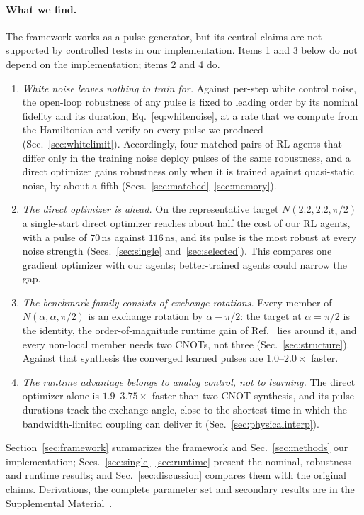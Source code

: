 \documentclass[aps,prx,twocolumn,superscriptaddress,nofootinbib,amsmath,amssymb,floatfix]{revtex4-2}
\newcommand{\Ntgt}[2]{N(#1,#1,#2)}
\newcommand{\ns}{\,\mathrm{ns}}
\begin{document}
\paragraph*{What we find.}
The framework works as a pulse generator, but its central claims are not supported by controlled tests
in our implementation. Items 1 and 3 below do not depend on the implementation; items 2 and 4 do.
\begin{enumerate}
\item \emph{White noise leaves nothing to train for.} Against per-step white control noise, the open-loop
robustness of any pulse is fixed to leading order by its nominal fidelity and its duration,
Eq.~\eqref{eq:whitenoise}, at a rate that we compute from the Hamiltonian and verify on every pulse we
produced (Sec.~\ref{sec:whitelimit}). Accordingly, four matched pairs of RL agents that differ only in
the training noise deploy pulses of the same robustness, and a direct optimizer gains robustness only when
it is trained against quasi-static noise, by about a fifth (Secs.~\ref{sec:matched}--\ref{sec:memory}).
\item \emph{The direct optimizer is ahead.} On the representative target $\Ntgt{2.2}{\pi/2}$ a single-start
direct optimizer reaches about half the cost of our RL agents, with a pulse of $70\ns$ against $116\ns$,
and its pulse is the most robust at every noise strength (Secs.~\ref{sec:single}
and~\ref{sec:selected}). This compares one gradient optimizer with our agents; better-trained agents
could narrow the gap.
\item \emph{The benchmark family consists of exchange rotations.} Every member of $\Ntgt{\alpha}{\pi/2}$
is an exchange rotation by $\alpha-\pi/2$: the target at $\alpha=\pi/2$ is the identity, the
order-of-magnitude runtime gain of Ref.~\cite{Niu2019} lies around it, and every non-local member needs
two CNOTs, not three (Sec.~\ref{sec:structure}). Against that synthesis the converged learned pulses are
$1.0$--$2.0\times$ faster.
\item \emph{The runtime advantage belongs to analog control, not to learning.} The direct optimizer alone
is $1.9$--$3.75\times$ faster than two-CNOT synthesis, and its pulse durations track the exchange angle,
close to the shortest time in which the bandwidth-limited coupling can deliver it
(Sec.~\ref{sec:physicalinterp}).
\end{enumerate}

Section~\ref{sec:framework} summarizes the framework and Sec.~\ref{sec:methods} our implementation;
Secs.~\ref{sec:single}--\ref{sec:runtime} present the nominal, robustness and runtime results; and
Sec.~\ref{sec:discussion} compares them with the original claims. Derivations, the complete parameter
set and secondary results are in the Supplemental Material~\cite{supp}.
\end{document}
